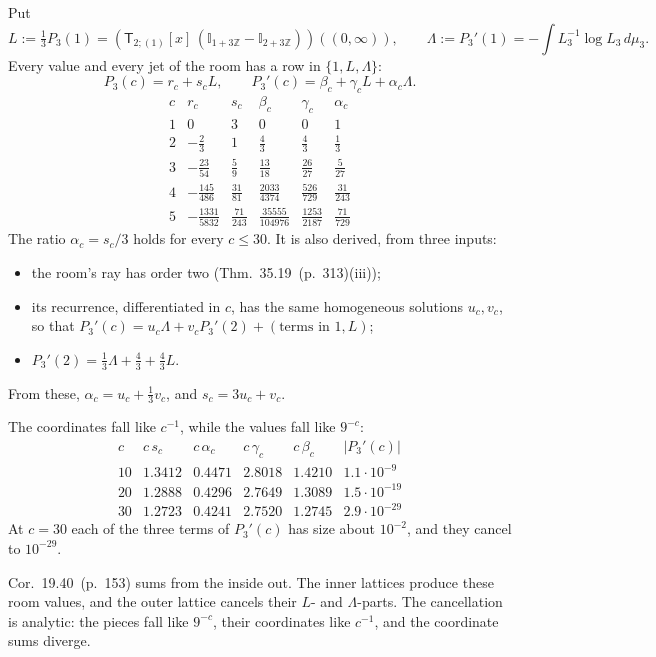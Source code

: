 \documentclass[11pt]{article}
\newcommand{\sT}{\mathsf T}
\newcommand{\Ilat}[1]{\mathbb I_{#1}}
\newcommand{\Tx}[3]{(\sT_{#1;(1)}[x]\,#2)((#3,\infty))}
\newcommand{\hb}[2]{#1~(p.~#2)}   %
\theoremstyle{plain}
\theoremstyle{remark}
\begin{document}
Put
\[
L:=\tfrac13P_3(1)=\Tx{2}{(\Ilat{1+3\mathbb Z}-\Ilat{2+3\mathbb Z})}{0},\qquad \Lambda:=P_3'(1)=-\int L_3^{-1}\log L_3\,d\mu_3 .
\]
Every value and every jet of the room has a row in $\{1,L,\Lambda\}$:
\[
P_3(c)=r_c+s_cL,\qquad P_3'(c)=\beta_c+\gamma_cL+\alpha_c\Lambda .
\]
\[
\begin{array}{c|cc|ccc}
c&r_c&s_c&\beta_c&\gamma_c&\alpha_c\\\hline
1&0&3&0&0&1\\
2&-\frac23&1&\frac43&\frac43&\frac13\\[2pt]
3&-\frac{23}{54}&\frac59&\frac{13}{18}&\frac{26}{27}&\frac5{27}\\[2pt]
4&-\frac{145}{486}&\frac{31}{81}&\frac{2033}{4374}&\frac{526}{729}&\frac{31}{243}\\[2pt]
5&-\frac{1331}{5832}&\frac{71}{243}&\frac{35555}{104976}&\frac{1253}{2187}&\frac{71}{729}
\end{array}
\]
The ratio $\alpha_c=s_c/3$ holds for every $c\le30$. It is also derived, from three inputs:
\begin{itemize}
\item the room's ray has order two (Thm.~\hb{35.19}{313}(iii));
\item its recurrence, differentiated in $c$, has the same homogeneous solutions $u_c,v_c$, so that $P_3'(c)=u_c\Lambda+v_cP_3'(2)+(\text{terms in }1,L)$;
\item $P_3'(2)=\frac13\Lambda+\frac43+\frac43L$.
\end{itemize}
From these, $\alpha_c=u_c+\frac13v_c$, and $s_c=3u_c+v_c$.

The coordinates fall like $c^{-1}$, while the values fall like $9^{-c}$:
\[
\begin{array}{c|cccc|c}
c&c\,s_c&c\,\alpha_c&c\,\gamma_c&c\,\beta_c&|P_3'(c)|\\\hline
10&1.3412&0.4471&2.8018&1.4210&1.1\cdot10^{-9}\\
20&1.2888&0.4296&2.7649&1.3089&1.5\cdot10^{-19}\\
30&1.2723&0.4241&2.7520&1.2745&2.9\cdot10^{-29}
\end{array}
\]
At $c=30$ each of the three terms of $P_3'(c)$ has size about $10^{-2}$, and they cancel to $10^{-29}$.

Cor.~\hb{19.40}{153} sums from the inside out. The inner lattices produce these room values, and the outer lattice cancels their $L$- and $\Lambda$-parts. The cancellation is analytic: the pieces fall like $9^{-c}$, their coordinates like $c^{-1}$, and the coordinate sums diverge.
\end{document}
